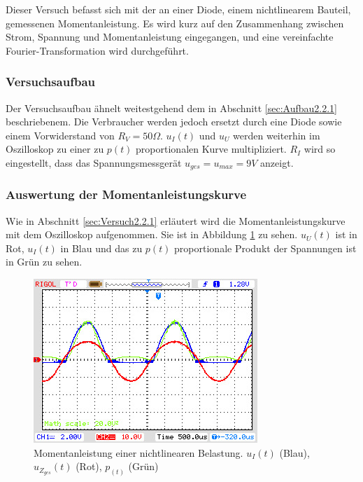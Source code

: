 
Dieser Versuch befasst sich mit der an einer Diode, einem nichtlinearem Bauteil, gemessenen Momentanleistung. Es wird kurz auf den Zusammenhang zwischen Strom, Spannung und Momentanleistung eingegangen, und eine vereinfachte Fourier-Transformation wird durchgeführt.

\subsubsection{Versuchsaufbau}
Der Versuchsaufbau ähnelt weitestgehend dem in Abschnitt \ref{sec:Aufbau2.2.1} beschriebenem. Die Verbraucher werden jedoch ersetzt durch eine Diode sowie einem Vorwiderstand von $R_V=50\Omega$. $u_I(t)$ und $u_U$ werden weiterhin im Oszilloskop zu einer zu $p(t)$ proportionalen Kurve multipliziert.
$R_I$ wird so eingestellt, dass das Spannungsmessgerät $u_{ges} = u_{max} = 9V$ anzeigt.

\subsubsection{Auswertung der Momentanleistungskurve}

Wie in Abschnitt \ref{sec:Versuch2.2.1} erläutert wird die Momentanleistungskurve mit dem Oszilloskop aufgenommen. Sie ist in Abbildung \ref{fig:MomLKurveNichtlinear} zu sehen. $u_U(t)$ ist in Rot, $u_I(t)$ in Blau und das zu $p(t)$ proportionale Produkt der Spannungen ist in Grün zu sehen.

\begin{figure}[H]
\centering
\includegraphics[width=0.8\linewidth]{Oszi-Bitmaps/NewFile5.jpg}
\caption{Momentanleistung einer nichtlinearen Belastung. $u_I(t)$ (Blau), $u_{Z_{ges}}(t)$ (Rot), $p_(t)$ (Grün)}
\label{fig:MomLKurveNichtlinear}
\end{figure}

